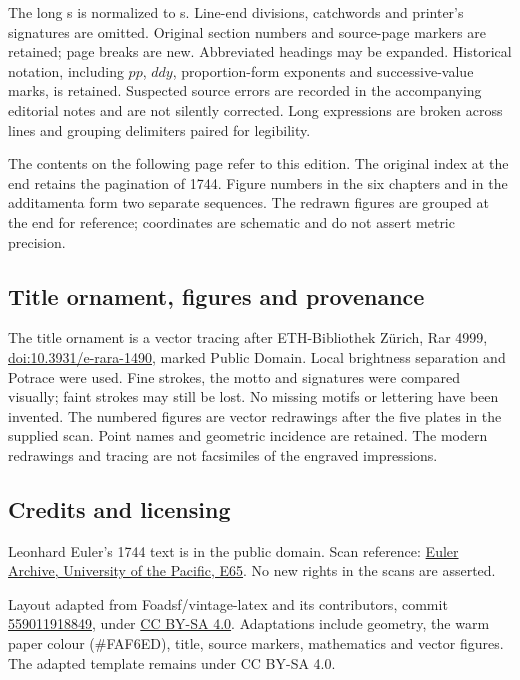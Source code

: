 \documentclass[11pt,twoside]{article}
\begin{document}
The long s is normalized to s. Line-end divisions, catchwords and printer's signatures are omitted. Original section numbers and source-page markers are retained; page breaks are new. Abbreviated headings may be expanded. Historical notation, including $pp$, $ddy$, proportion-form exponents and successive-value marks, is retained. Suspected source errors are recorded in the accompanying editorial notes and are not silently corrected. Long expressions are broken across lines and grouping delimiters paired for legibility.

The contents on the following page refer to this edition. The original index at the end retains the pagination of 1744. Figure numbers in the six chapters and in the additamenta form two separate sequences. The redrawn figures are grouped at the end for reference; coordinates are schematic and do not assert metric precision.

\subsection*{Title ornament, figures and provenance}
The title ornament is a vector tracing after ETH-Bibliothek Zürich, Rar 4999, \href{https://doi.org/10.3931/e-rara-1490}{doi:10.3931/e-rara-1490}, marked Public Domain. Local brightness separation and Potrace were used. Fine strokes, the motto and signatures were compared visually; faint strokes may still be lost. No missing motifs or lettering have been invented. The numbered figures are vector redrawings after the five plates in the supplied scan. Point names and geometric incidence are retained. The modern redrawings and tracing are not facsimiles of the engraved impressions.

\subsection*{Credits and licensing}
Leonhard Euler's 1744 text is in the public domain. Scan reference: \href{https://scholarlycommons.pacific.edu/euler-works/65/}{Euler Archive, University of the Pacific, E65}. No new rights in the scans are asserted.

Layout adapted from Foadsf/vintage-latex and its contributors, commit \href{https://github.com/Foadsf/vintage-latex/tree/559011918849a3da819912a7c26493071d542df5}{559011918849}, under \href{https://creativecommons.org/licenses/by-sa/4.0/}{CC BY-SA 4.0}. Adaptations include geometry, the warm paper colour (\#FAF6ED), title, source markers, mathematics and vector figures. The adapted template remains under CC BY-SA 4.0.
\end{document}

